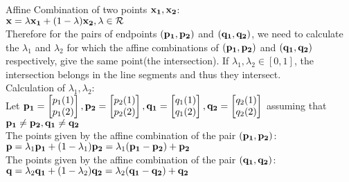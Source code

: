 \documentclass[11pt]{article}
\begin{document}
\begin{enumerate}
		Affine Combination of two points ${\bf x_1},{\bf x_2}$:\\
		$\displaystyle {\bf x}=\lambda{\bf x_1} + (1-\lambda){\bf x_2},\lambda\in \mathcal{R}$\\
		
		Therefore for the pairs of endpoints $({\bf p_1},{\bf p_2})$ and $({\bf q_1},{\bf q_2})$, we need to calculate the $\lambda_1$ and $\lambda_2$ for which the affine combinations of $({\bf p_1},{\bf p_2})$ and $({\bf q_1},{\bf q_2})$ respectively, give the same point(the intersection). If $\lambda_1,\lambda_2\in[0,1]$, the intersection belongs in the line segments and thus they intersect.\\
		
		Calculation of $\lambda_1,\lambda_2$:\\
		Let ${\bf p_1}=\begin{bmatrix}
			p_1(1)\\p_1(2)
		\end{bmatrix},{\bf p_2}=\begin{bmatrix}
		p_2(1)\\p_2(2)
		\end{bmatrix},{\bf q_1}=\begin{bmatrix}
		q_1(1)\\q_1(2)
		\end{bmatrix},{\bf q_2}=\begin{bmatrix}
		q_2(1)\\q_2(2)
		\end{bmatrix}$ assuming that ${\bf p_1}\ne {\bf p_2},{\bf q_1}\ne {\bf q_2}$\\
	
		The points given by the affine combination of the pair $({\bf p_1},{\bf p_2})$:\\
		$\displaystyle {\bf p}=\lambda_1{\bf p_1}+(1-\lambda_1){\bf p_2}=\lambda_1({\bf p_1}-{\bf p_2})+{\bf p_2}$\\
		
		The points given by the affine combination of the pair $({\bf q_1},{\bf q_2})$:\\
		$\displaystyle {\bf q}=\lambda_2{\bf q_1}+(1-\lambda_2){\bf q_2}=\lambda_2({\bf q_1}-{\bf q_2})+{\bf q_2}$\\
		

\end{enumerate}
\end{document}
